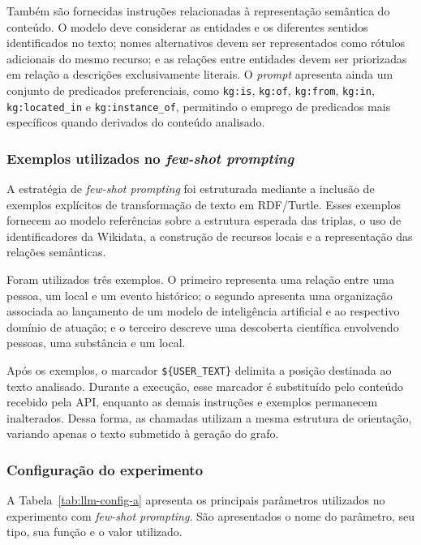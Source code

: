 Também são fornecidas instruções relacionadas à representação semântica do conteúdo. O modelo deve considerar as entidades e os diferentes sentidos identificados no texto; nomes alternativos devem ser representados como rótulos adicionais do mesmo recurso; e as relações entre entidades devem ser priorizadas em relação a descrições exclusivamente literais. O \textit{prompt} apresenta ainda um conjunto de predicados preferenciais, como \texttt{kg:is}, \texttt{kg:of}, \texttt{kg:from}, \texttt{kg:in}, \texttt{kg:located\_in} e \texttt{kg:instance\_of}, permitindo o emprego de predicados mais específicos quando derivados do conteúdo analisado.


\subsubsection{Exemplos utilizados no \textit{few-shot prompting}}

A estratégia de \textit{few-shot prompting} foi estruturada mediante a inclusão de exemplos explícitos de transformação de texto em RDF/Turtle. Esses exemplos fornecem ao modelo referências sobre a estrutura esperada das triplas, o uso de identificadores da Wikidata, a construção de recursos locais e a representação das relações semânticas.

Foram utilizados três exemplos. O primeiro representa uma relação entre uma pessoa, um local e um evento histórico; o segundo apresenta uma organização associada ao lançamento de um modelo de inteligência artificial e ao respectivo domínio de atuação; e o terceiro descreve uma descoberta científica envolvendo pessoas, uma substância e um local.

Após os exemplos, o marcador \texttt{\$\{USER\_TEXT\}} delimita a posição destinada ao texto analisado. Durante a execução, esse marcador é substituído pelo conteúdo recebido pela API, enquanto as demais instruções e exemplos permanecem inalterados. Dessa forma, as chamadas utilizam a mesma estrutura de orientação, variando apenas o texto submetido à geração do grafo.


\subsubsection{Configuração do experimento}

A Tabela~\ref{tab:llm-config-a} apresenta os principais parâmetros utilizados no experimento com \textit{few-shot prompting}. São apresentados o nome do parâmetro, seu tipo, sua função e o valor utilizado.

